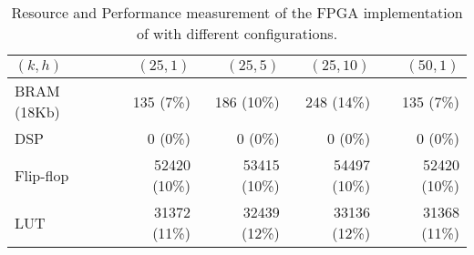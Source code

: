 \begin{table}
\begin{center}
\small
\begin{tabular}{ l r r r r } 
\toprule
$(k, h)$ & $(25, 1)$ & $(25, 5)$ & $(25,10)$ & $(50, 1)$ \\
\midrule
BRAM (18Kb) & 135 (7\%) & 186 (10\%) & 248 (14\%) & 135 (7\%) \\
DSP & 0 (0\%) & 0 (0\%) & 0 (0\%) & 0 (0\%) \\
Flip-flop & 52420 (10\%) & 53415 (10\%) & 54497 (10\%) & 52420 (10\%) \\
LUT & 31372 (11\%) & 32439 (12\%) & 33136 (12\%) & 31368 (11\%) \\
\bottomrule
\end{tabular}
\caption{Resource and Performance measurement %
of the FPGA %
implementation of \OurSys with different configurations.}
\label{tab:microbenchmarks}
\end{center}
\end{table}

